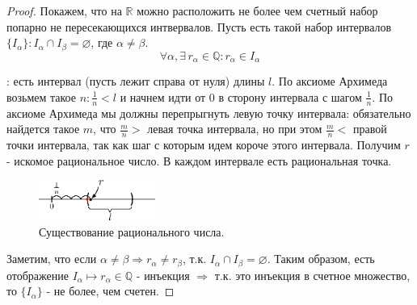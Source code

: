 \documentclass[12pt]{article}
\theoremstyle{definition}
\begin{document}
\begin{proof}
	Покажем, что на $\mathbb{R}$ можно расположить не более чем счетный набор попарно не пересекающихся интвервалов. Пусть есть такой набор интервалов $\{I_\alpha\} \colon I_\alpha \cap I_\beta = \varnothing$, где $\alpha \neq \beta$. $$\forall \alpha, \exists \, r_\alpha \in \mathbb{Q} \colon r_\alpha \in I_\alpha$$
	
	: есть интервал (пусть лежит справа от нуля) длины $l$. По аксиоме Архимеда возьмем такое $n \colon \frac{1}{n} < l$ и начнем идти от $0$ в сторону интервала с шагом $\frac{1}{n}$. По аксиоме Архимеда мы должны перепрыгнуть левую точку интервала: обязательно найдется такое $m$, что $\frac{m}{n} >$ левая точка интервала, но при этом $\frac{m}{n} <$ правой точки интервала, так как шаг с которым идем короче этого интервала. Получим $r$ - искомое рациональное число. В каждом интервале есть рациональная точка. 
	
	\begin{figure}[H]
		\centering
		\includegraphics[width=0.34\textwidth]{11_7.eps}
		\caption{Существование рационального числа.}
		\label{11_7}
	\end{figure}
	
	Заметим, что если $\alpha \neq \beta \Rightarrow r_\alpha \neq r_\beta$, т.к. $I_\alpha \cap I_\beta = \varnothing$. Таким образом, есть отображение $I_\alpha \mapsto r_\alpha \in \mathbb{Q}$ - инъекция $\Rightarrow$ т.к. это инъекция в счетное множество, то $\{I_\alpha\}$ - не более, чем счетен.
\end{proof}
\end{document}
